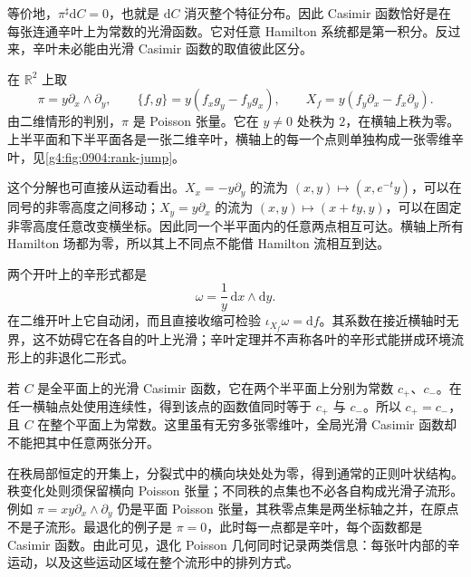 等价地，\(\pi^\sharp\mathrm{d}C=0\)，也就是 \(\mathrm{d}C\) 消灭整个特征分布。因此 Casimir 函数恰好是在每张连通辛叶上为常数的光滑函数。它对任意 Hamilton 系统都是第一积分。反过来，辛叶未必能由光滑 Casimir 函数的取值彼此区分。

\begin{example}\label{g4:exm:0904:rank-jump-plane}
	在 \(\mathbb R^2\) 上取
	\[
		\pi=y\partial_x\wedge\partial_y,
		\qquad
		\{f,g\}=y(f_xg_y-f_yg_x),
		\qquad
		X_f=y(f_y\partial_x-f_x\partial_y).
	\]
	由二维情形的判别，\(\pi\) 是 Poisson 张量。它在 \(y\neq0\) 处秩为 \(2\)，在横轴上秩为零。上半平面和下半平面各是一张二维辛叶，横轴上的每一个点则单独构成一张零维辛叶，见\cref{g4:fig:0904:rank-jump}。

	这个分解也可直接从运动看出。\(X_x=-y\partial_y\) 的流为 \((x,y)\mapsto(x,e^{-t}y)\)，可以在同号的非零高度之间移动；\(X_y=y\partial_x\) 的流为 \((x,y)\mapsto(x+ty,y)\)，可以在固定非零高度任意改变横坐标。因此同一个半平面内的任意两点相互可达。横轴上所有 Hamilton 场都为零，所以其上不同点不能借 Hamilton 流相互到达。

	两个开叶上的辛形式都是
	\[
		\omega=\frac1y\,\mathrm{d}x\wedge\mathrm{d}y.
	\]
	在二维开叶上它自动闭，而且直接收缩可检验 \(\iota_{X_f}\omega=\mathrm{d}f\)。其系数在接近横轴时无界，这不妨碍它在各自的叶上光滑；辛叶定理并不声称各叶的辛形式能拼成环境流形上的非退化二形式。

	若 \(C\) 是全平面上的光滑 Casimir 函数，它在两个半平面上分别为常数 \(c_+\)、\(c_-\)。在任一横轴点处使用连续性，得到该点的函数值同时等于 \(c_+\) 与 \(c_-\)。所以 \(c_+=c_-\)，且 \(C\) 在整个平面上为常数。这里虽有无穷多张零维叶，全局光滑 Casimir 函数却不能把其中任意两张分开。
\end{example}



在秩局部恒定的开集上，分裂式中的横向块处处为零，得到通常的正则叶状结构。秩变化处则须保留横向 Poisson 张量；不同秩的点集也不必各自构成光滑子流形。例如 \(\pi=xy\partial_x\wedge\partial_y\) 仍是平面 Poisson 张量，其秩零点集是两坐标轴之并，在原点不是子流形。最退化的例子是 \(\pi=0\)，此时每一点都是辛叶，每个函数都是 Casimir 函数。由此可见，退化 Poisson 几何同时记录两类信息：每张叶内部的辛运动，以及这些运动区域在整个流形中的排列方式。
